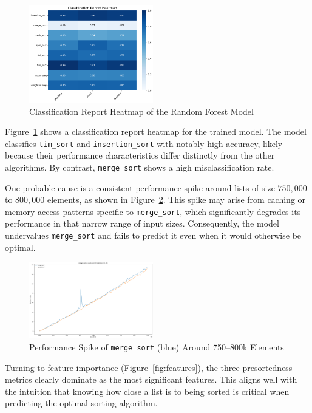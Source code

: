 \documentclass[twocolumn]{article}
\begin{document}
\begin{figure}[htbp]
  \centering
  \includegraphics[width=0.48\textwidth]{../Implementation/figures/classification_report_heatmap.png}
  \caption{Classification Report Heatmap of the Random Forest Model}
  \label{fig:my_image}
\end{figure}

Figure~\ref{fig:my_image} shows a classification report heatmap for the trained model. The model 
classifies \texttt{tim\_sort} and \texttt{insertion\_sort} with notably high accuracy, likely 
because their performance characteristics differ distinctly from the other algorithms. By contrast, 
\texttt{merge\_sort} shows a high misclassification rate. 

One probable cause is a consistent performance spike around lists of size $750{,}000$ to $800{,}000$ 
elements, as shown in Figure~\ref{fig:merge_spike}. This spike may arise from caching or 
memory-access patterns specific to \texttt{merge\_sort}, which significantly degrades its performance 
in that narrow range of input sizes. Consequently, the model undervalues \texttt{merge\_sort} and 
fails to predict it even when it would otherwise be optimal.

\begin{figure}[htbp]
  \centering
  \includegraphics[width=0.48\textwidth]{../Implementation/figures/merge_sort_problem.png}
  \caption{Performance Spike of \texttt{merge\_sort} (blue) Around 750--800k Elements}
  \label{fig:merge_spike}
\end{figure}

Turning to feature importance (Figure~\ref{fig:features}), the three presortedness metrics 
clearly dominate as the most significant features. This aligns well with the intuition 
that knowing how close a list is to being sorted is critical when predicting the optimal 
sorting algorithm.
\end{document}
